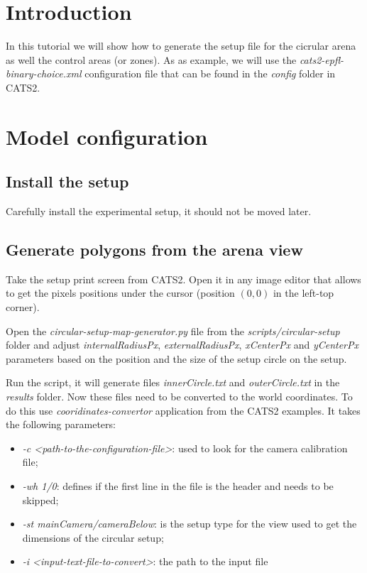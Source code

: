 \documentclass{styles/assisi}
\begin{document}

\lstset{
    language=xml,
    tabsize=3,
    xleftmargin=20pt,
    framexleftmargin=15pt,
    numbers=left,
    numberstyle=\tiny,
    numbersep=5pt,
    breaklines=true,
    showstringspaces=false,
    basicstyle=\footnotesize}

\chapter{Introduction}\label{chap:intro}
In this tutorial we will show how to generate the setup file for the cicrular arena as well the control areas (or zones). As as example, we will use the {\it cats2-epfl-binary-choice.xml} configuration file that can be found in the {\it config} folder in CATS2.

\chapter{Model configuration}\label{chap:intro}
\section{Install the setup}
Carefully install the experimental setup, it should not be moved later. 

\section{Generate polygons from the arena view}
Take the setup print screen from CATS2. Open it in any image editor that allows to get the pixels positions under the cursor (position $(0,0)$ in the left-top corner). 

Open the {\it circular-setup-map-generator.py} file from the {\it scripts/circular-setup} folder and adjust {\it internalRadiusPx}, {\it externalRadiusPx}, {\it xCenterPx} and {\it yCenterPx} parameters based on the position and the size of the setup circle on the setup. 

Run the script, it will generate files {\it innerCircle.txt} and {\it outerCircle.txt} in the {\it results} folder. Now these files need to be converted to the world coordinates. To do this use {\it cooridinates-convertor} application from the CATS2 examples. It takes the following parameters: 
\begin{itemize}
\item {\it -c  <path-to-the-configuration-file>}: used to look for the camera calibration file;
\item {\it -wh 1/0}: defines if the first line in the file is the header and needs to be skipped;
\item {\it -st mainCamera/cameraBelow}: is the setup type for the view used to get the dimensions of the circular setup;
\item {\it -i <input-text-file-to-convert>}: the path to the input file
\end{itemize}
\end{document}
